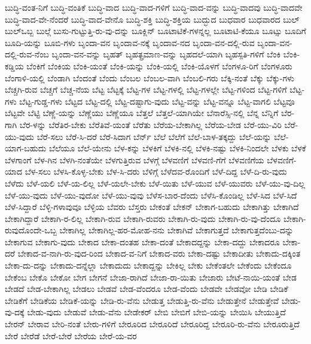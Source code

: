 {ಬುದ್ಧಿ-ವಂತ-ನಿಗೆ
ಬುದ್ಧಿ-ವಂತಿಕೆ
ಬುದ್ಧಿ-ವಾದ
ಬುದ್ಧಿ-ವಾದ-ಗಳಿಗೆ
ಬುದ್ಧಿ-ವಾದ-ವನ್ನು
ಬುದ್ಧಿ-ವಾದವು
ಬುದ್ಧಿ-ವಾದವೇ
ಬುದ್ಧಿ-ವಾದ-ವೇ-ನೆಂದರೆ
ಬುದ್ಧಿ-ವಾದ-ವೇನೊ
ಬುದ್ಧಿ-ಶಕ್ತಿ
ಬುದ್ಧಿ-ಶಕ್ತಿಯ
ಬುದ್ಭುದ
ಬುಧವಾರ
ಬುಧವಾರದ
ಬುಲ್
ಬುಲ್ಒಬ್ಬ
ಬುಲ್ಗೆ
ಬುಸು-ಗುಟ್ಟುತ್ತಿ-ರು-ವು-ದನ್ನು
ಬೂಕ್ಲಿನ್
ಬೂಟಾಟಿಕೆ-ಗಳನ್ನಲ್ಲ
ಬೂಟಾಟಿ-ಕೆಯೂ
ಬೂಟ್ಸು
ಬೂದಿಗೆ
ಬೂದಿ-ಯನ್ನು
ಬೂಬಿ-ಗಳು
ಬೃಂದಾ-ವನ
ಬೃಂದಾವ-ನಕ್ಕೆ
ಬೃಂದಾವ-ನದ
ಬೃಂದಾ-ವನ-ದಲ್ಲಿ-ರುವ
ಬೃಂದಾ-ವನ-ದಲ್ಲಿ-ರುವ-ನೆಂಬ
ಬೃಂದಾ-ವನ-ವನ್ನು
ಬೃಹತ್
ಬೃಹತ್ಪ್ರಮಾಣ-ವನ್ನು
ಬೃಹದಲೆ-ಯಾಗಿ
ಬೃಹಸ್ಪತಿ-ಗಳಿಗೆ
ಬೆಂಕಿ
ಬೆಂಕಿ-ಕಡ್ಡಿಯ
ಬೆಂಕಿಗೆ
ಬೆಂಕಿಯ
ಬೆಂಕಿ-ಯಂತೆ
ಬೆಂಕಿ-ಯನ್ನು
ಬೆಂಕಿ-ಯಲ್ಲಿ
ಬೆಂಕಿ-ಯೊಳಗೆ
ಬೆಂಗಳೂ-ರಿಗೆ
ಬೆಂಗಳೂರು
ಬೆಂಗಾಳಿ-ಯಲ್ಲಿ
ಬೆಂಡಾಗಿ
ಬೆಂದಂತೆ
ಬೆಂದು
ಬೆಂಬಲ
ಬೆಂಬಲ-ವಾಗಿ
ಬೆಂಬಲಿ-ಗರು
ಬೆಕ್ಕಿ-ನಂತೆ
ಬೆಕ್ಕು
ಬೆಕ್ಕು-ಗಳು
ಬೆಚ್ಚಗಿ-ರುವ
ಬೆಚ್ಚಗೆ
ಬೆಚ್ಚ-ನೆಯ
ಬೆಟ್ಟ
ಬೆಟ್ಟಕ್ಕೆ
ಬೆಟ್ಟ-ಗಳ
ಬೆಟ್ಟ-ಗಳಲ್ಲಿ
ಬೆಟ್ಟ-ಗಳಲ್ಲೇ
ಬೆಟ್ಟ-ಗಳಿಂದ
ಬೆಟ್ಟ-ಗಳಿಗೆ
ಬೆಟ್ಟ-ಗಳು
ಬೆಟ್ಟ-ಗುಡ್ಡ-ಗಳು
ಬೆಟ್ಟದ
ಬೆಟ್ಟ-ದಲ್ಲಿ
ಬೆಟ್ಟ-ದಷ್ಟಾಗು-ವುದು
ಬೆಟ್ಟ-ವನ್ನು
ಬೆಟ್ಟ-ವನ್ನೂ
ಬೆಟ್ಟ-ವಾಗಲಿ
ಬೆಟ್ಟವೂ
ಬೆಟ್ಟವೇ
ಬೆಟ್ಟಿ
ಬೆಣ್ಣೆ-ಯನ್ನು
ಬೆಣ್ಣೆಯು
ಬೆಣ್ಣೆಯೂ
ಬೆತ್ತಲೆ
ಬೆತ್ತಲೆ-ಯಾಗಿಯೇ
ಬೆನಾರೆಸ್ಸಿ-ನಲ್ಲಿ
ಬೆನ್ನ
ಬೆನ್ನಿಗೆ
ಬೆರ-ಗಾಗಿ
ಬೆರ-ಳನ್ನು
ಬೆರೆತಿರ-ಬೇಕು
ಬೆರೆತಿವೆ-ಯಂತೆ
ಬೆರೆತು
ಬೆರೆಯ-ಬೇಕಾಗಿಲ್ಲ
ಬೆರೆಯ-ಬೇಡ
ಬೆರೆ-ಯು-ವಿರಿ
ಬೆರೆ-ಯು-ವುದು
ಬೆರೆ-ಸಲು
ಬೆರೆ-ಸಿ-ದರೆ
ಬೆರೆ-ಸಿದಾಗ
ಬೆರ್ನ್
ಬೆಲೆ
ಬೆಲೆಗೆ
ಬೆಲೆ-ಬಾಳ-ತಕ್ಕದ್ದು
ಬೆಲೆ-ಯನ್ನು
ಬೆಲೆ-ಯಾಗ-ಬಹುದು
ಬೆಲೆಯೂ
ಬೆಲೆ-ಯೇನು
ಬೆಳ-ಕನ್ನು
ಬೆಳಕಿಗೆ
ಬೆಳಕಿ-ನಲ್ಲಿ
ಬೆಳಕಿ-ನಷ್ಟು
ಬೆಳಕಿ-ನಿಂದಲೇ
ಬೆಳಕು
ಬೆಳಕೆ
ಬೆಳಗಾಂಗೆ
ಬೆಳ-ಗಿನ
ಬೆಳಗಿ-ನಂತೆಯೇ
ಬೆಳಗುತ್ತಿರುವ
ಬೆಳಗ್ಗೆ
ಬೆಳವಣಿಗೆ
ಬೆಳವಣಿ-ಗೆಗೆ
ಬೆಳವಣಿಗೆಯ
ಬೆಳವಣಿಗೆ-ಯಾದ
ಬೆಳ-ಸಲು
ಬೆಳಸಿ-ಕೊಳ್ಳ-ಬೇಕು
ಬೆಳ-ಸಿ-ದರು
ಬೆಳಿಗ್ಗೆ
ಬೆಳೆದವ-ರೊಂದಿಗೆ
ಬೆಳೆ-ದಿದ್ದ
ಬೆಳೆ-ದಿ-ರು-ವುದು
ಬೆಳೆದು
ಬೆಳೆ-ಯಲಿ
ಬೆಳೆ-ಯ-ಲಿಲ್ಲ
ಬೆಳೆ-ಯಲೇ-ಬೇಕು
ಬೆಳೆ-ಯಿತು
ಬೆಳೆ-ಯುವ
ಬೆಳೆ-ಯುವರು
ಬೆಳೆ-ಯು-ವು-ದಿಲ್ಲ
ಬೆಳೆ-ಯು-ವುದು
ಬೆಳೆ-ಯು-ವುದೋ
ಬೆಳೆ-ಯು-ವುವು
ಬೆಳೆಸ-ಬಾರ-ದೆಂದು
ಬೆಳೆಸಿ-ಕೊಂಡಿಲ್ಲ
ಬೆಳೆ-ಸಿದ
ಬೆಳೆ-ಸಿದೆ
ಬೆಳೆ-ಸಿದ್ದಾರೆ
ಬೆಳ್ಳಿ-ಗಳಾವುವೂ
ಬೆಳ್ಳಿಯ
ಬೆವರು
ಬೆಸ್ತರು
ಬೇಕಂತೆ
ಬೇಕನ್
ಬೇಕಾಗ-ಬಹುದು
ಬೇಕಾಗಿತ್ತು
ಬೇಕಾಗಿದೆ
ಬೇಕಾಗಿದ್ದಾರೆ
ಬೇಕಾಗಿ-ರ-ಲಿಲ್ಲ
ಬೇಕಾಗಿ-ರುವ
ಬೇಕಾಗಿ-ರುವರು
ಬೇಕಾಗಿ-ರು-ವುದು
ಬೇಕಾಗಿ-ರು-ವು-ದೆಂದೂ
ಬೇಕಾಗಿ-ರುವುದೊಂದೇ-ಒಬ್ಬ
ಬೇಕಾಗಿಲ್ಲ
ಬೇಕಾಗಿಲ್ಲ-ಹರ-ಮೋಹ-ನನು
ಬೇಕಾಗಿವೆ
ಬೇಕಾಗುತ್ತದೆ
ಬೇಕಾಗುತ್ತದೆಂಬು-ದನ್ನು
ಬೇಕಾಗುವ
ಬೇಕಾಗು-ವುದು
ಬೇಕಾದ
ಬೇಕಾ-ದಂತಹ
ಬೇಕಾ-ದಂತೆ
ಬೇಕಾದದ್ದನ್ನು
ಬೇಕಾ-ದದ್ದು
ಬೇಕಾದರೂ
ಬೇಕಾ-ದರೆ
ಬೇಕಾದ-ವ-ನಾಗಿ-ರು-ವುದ-ರಿಂದ
ಬೇಕಾದ-ವ-ನಿಗೆ
ಬೇಕಾದ-ವರು
ಬೇಕಾ-ದಷ್ಟು
ಬೇಕಾದೀತು
ಬೇಕಾದು-ದಕ್ಕಿಂತ
ಬೇಕಾ-ದು-ದನ್ನು
ಬೇಕಾದು-ದನ್ನೆಲ್ಲಾ
ಬೇಕಾದುದು
ಬೇಕಾದ್ದನ್ನು
ಬೇಕಿಲ್ಲ
ಬೇಕು
ಬೇಕೆಂತಲೇ
ಬೇಕೆಂದು
ಬೇಕೆಂದೂ
ಬೇಕೆಂಬ
ಬೇಕೊ
ಬೇಕೋ
ಬೇಗ
ಬೇಗನೆ
ಬೇಜಾ-ರಾಗಿದೆ
ಬೇಜಾ-ರಾ-ಯಿತು
ಬೇಜಾರು
ಬೇಟೆ-ನಾಯಿ-ಯಂತೆ
ಬೇಡ
ಬೇಡದೆ
ಬೇಡ-ಬೇಕಾಗಿಲ್ಲ
ಬೇಡಲು
ಬೇಡವೆ
ಬೇಡ-ವೆಂದರೂ
ಬೇಡ-ವೆಂದು
ಬೇಡವೇ
ಬೇಡವೋ
ಬೇಡಿ
ಬೇಡಿಕೆ
ಬೇಡಿಕೆಗೆ
ಬೇಡಿಕೆಯ
ಬೇಡಿಕೆ-ಯನ್ನು
ಬೇಡಿ-ರು-ವೆನು
ಬೇಡುತ್ತ
ಬೇಡುತ್ತಿ-ರು-ವೆನು
ಬೇಡುತ್ತೇನೆ
ಬೇಡುತ್ತೇವೆ
ಬೇಡು-ವು-ದಕ್ಕೆ
ಬೇಡು-ವುದು
ಬೇಡುವೆ
ಬೇಡು-ವೆನು
ಬೇಡೇಕರ್
ಬೇಬಿ
ಬೇಬಿಗೆ
ಬೇಬಿ-ಯನ್ನು
ಬೇಯಿಸಿ
ಬೇಯುತ್ತಿದೆ
ಬೇರನ್
ಬೇರಾವ
ಬೇರಿ-ನಂತೆ
ಬೇರು-ಗಳಿಗೆ
ಬೇರೂರಿದ
ಬೇರೂರಿದೆ
ಬೇರೂರಿದ್ದ
ಬೇರೂರಿ-ರು-ವೆನು
ಬೇರೂರುತ್ತಿದೆ
ಬೇರೆ
ಬೇರೆಡೆ
ಬೇರೆ-ಬೇರೆ
ಬೇರೆಯ
ಬೇರೆ-ಯ-ವರ
}
